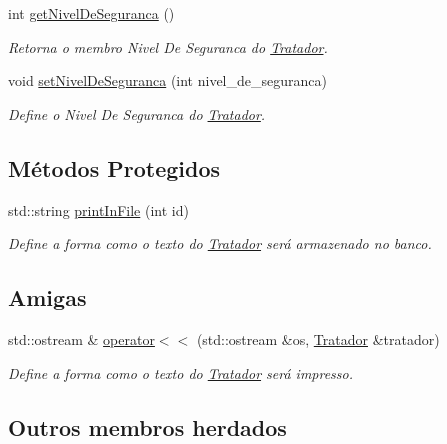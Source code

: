 \begin{DoxyCompactItemize}
int \hyperlink{classTratador_a22ba37b0fd4b7adbd0b52de0d695c01a}{get\+Nivel\+De\+Seguranca} ()
\begin{DoxyCompactList}\small\item\em Retorna o membro Nivel De Seguranca do \hyperlink{classTratador}{Tratador}. \end{DoxyCompactList}\item 
void \hyperlink{classTratador_a508aa328b9235c262c74064c95357976}{set\+Nivel\+De\+Seguranca} (int nivel\+\_\+de\+\_\+seguranca)
\begin{DoxyCompactList}\small\item\em Define o Nivel De Seguranca do \hyperlink{classTratador}{Tratador}. \end{DoxyCompactList}\end{DoxyCompactItemize}
\subsection*{Métodos Protegidos}
\begin{DoxyCompactItemize}
\item 
std\+::string \hyperlink{classTratador_af2efc58696c20320f51741d01a958ef7}{print\+In\+File} (int id)
\begin{DoxyCompactList}\small\item\em Define a forma como o texto do \hyperlink{classTratador}{Tratador} será armazenado no banco. \end{DoxyCompactList}\end{DoxyCompactItemize}
\subsection*{Amigas}
\begin{DoxyCompactItemize}
\item 
std\+::ostream \& \hyperlink{classTratador_af761ac4dd4aeeeddd1bcb83bdef6a4dd}{operator$<$$<$} (std\+::ostream \&os, \hyperlink{classTratador}{Tratador} \&tratador)
\begin{DoxyCompactList}\small\item\em Define a forma como o texto do \hyperlink{classTratador}{Tratador} será impresso. \end{DoxyCompactList}\end{DoxyCompactItemize}
\subsection*{Outros membros herdados}


